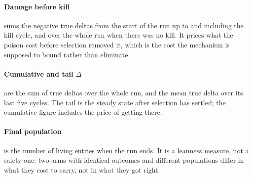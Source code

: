 \paragraph{Damage before kill} sums the negative true deltas from the start
of the run up to and including the kill cycle, and over the whole run when
there was no kill. It prices what the poison cost before selection removed
it, which is the cost the mechanism is supposed to bound rather than
eliminate.

\paragraph{Cumulative and tail $\Delta$} are the sum of true deltas over the
whole run, and the mean true delta over its last five cycles. The tail is the
steady state after selection has settled; the cumulative figure includes the
price of getting there.

\paragraph{Final population} is the number of living entries when the run
ends. It is a leanness measure, not a safety one: two arms with identical
outcomes and different populations differ in what they cost to carry, not in
what they got right.
